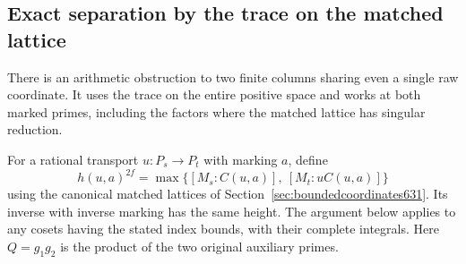 \documentclass[a4paper,11pt]{article}
\theoremstyle{definition}
\theoremstyle{remark}
\numberwithin{equation}{section}
\begin{document}
\subsection{Exact separation by the trace on the matched lattice}
\label{sec:matchedtrace638}

There is an arithmetic obstruction to two finite columns sharing
even a single raw coordinate. It uses the trace on the entire
positive space and works at both marked primes, including the
factors where the matched lattice has singular reduction.

For a rational transport \(u:P_s\to P_t\) with marking \(a\), define
\[
        h(u,a)^{2f}
          =\max\{[M_s:C(u,a)],\ [M_t:u C(u,a)]\}
\]
using the canonical matched lattices of
Section~\ref{sec:boundedcoordinates631}. Its inverse with inverse
marking has the same height. The argument below applies to any
cosets having the stated index bounds, with their complete integrals.
Here \(Q=g_1g_2\) is the product of the two original auxiliary primes.
\end{document}
